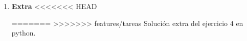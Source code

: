 \documentclass[11pt,letterpaper]{article}
\begin{document}
\begin{enumerate}
\item \textbf{Extra} 
<<<<<<< HEAD

=======
>>>>>>> features/tareas
Solución extra del ejercicio 4 en python. 




\end{enumerate}
\end{document}
